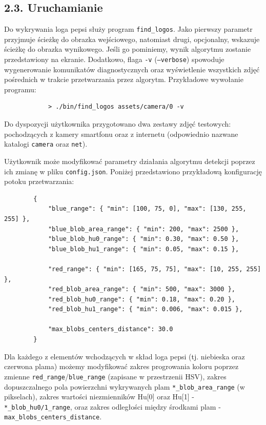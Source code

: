 \documentclass[11pt,a4paper,twoside]{report}
\begin{document}
	\subsection*{2.3. Uruchamianie}

		Do wykrywania loga pepsi służy program \texttt{find\_logos}. Jako pierwszy parametr przyjmuje ścieżkę do obrazka wejściowego, natomiast drugi, opcjonalny, wskazuje ścieżkę do obrazka wynikowego. Jeśli go pominiemy, wynik algorytmu zostanie przedstawiony na ekranie. Dodatkowo, flaga \texttt{-v} (\texttt{--verbose}) spowoduje wygenerowanie komunikatów diagnostycznych oraz wyświetlenie wszystkich zdjęć pośrednich w trakcie przetwarzania przez algorytm. Przykładowe wywołanie programu:

		\begin{verbatim}
		    > ./bin/find_logos assets/camera/0 -v
		\end{verbatim}

		Do dyspozycji użytkownika przygotowano dwa zestawy zdjęć testowych: pochodzących z kamery smartfonu oraz z internetu (odpowiednio nazwane katalogi \texttt{camera} oraz \texttt{net}).

		Użytkownik może modyfikować parametry działania algorytmu detekcji poprzez ich zmianę w pliku \texttt{config.json}. Poniżej przedstawiono przykładową konfigurację potoku przetwarzania:

		\begin{verbatim}
		{
		    "blue_range": { "min": [100, 75, 0], "max": [130, 255, 255] },
		    "blue_blob_area_range": { "min": 200, "max": 2500 },
		    "blue_blob_hu0_range": { "min": 0.30, "max": 0.50 },
		    "blue_blob_hu1_range": { "min": 0.05, "max": 0.15 },

		    "red_range": { "min": [165, 75, 75], "max": [10, 255, 255] },
		    "red_blob_area_range": { "min": 500, "max": 3000 },
		    "red_blob_hu0_range": { "min": 0.18, "max": 0.20 },
		    "red_blob_hu1_range": { "min": 0.006, "max": 0.015 },

		    "max_blobs_centers_distance": 30.0
		}
		\end{verbatim}

		Dla każdego z elementów wchodzących w skład loga pepsi (tj. niebieska oraz czerwona plama) możemy modyfikować zakres progrowania koloru poprzez zmienne \texttt{red\_range}/\texttt{blue\_range} (zapisane w przestrzenii HSV), zakres dopuszczalnego pola powierzchni wykrywanych plam \texttt{*\_blob\_area\_range} (w pikselach), zakres wartości niezmienników Hu[0] oraz Hu[1] - \texttt{*\_blob\_hu0/1\_range}, oraz zakres odległości między środkami plam - \texttt{max\_blobs\_centers\_distance}.
\end{document}
